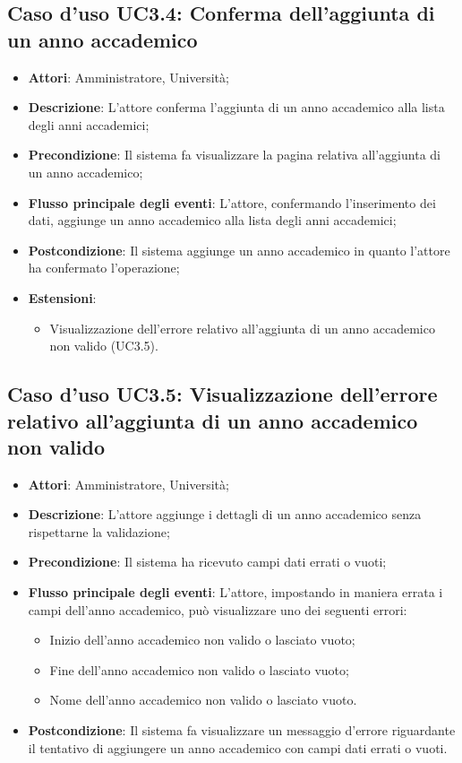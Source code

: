 \subsection{Caso d'uso \texorpdfstring{UC3.4}{UC3.4}: Conferma dell'aggiunta di un anno accademico}
\begin{itemize}
	\item \textbf{Attori}: Amministratore, Università;
	\item \textbf{Descrizione}: L'attore conferma l'aggiunta di un anno accademico alla lista degli anni accademici;
	\item \textbf{Precondizione}: Il sistema fa visualizzare la pagina relativa all'aggiunta di un anno accademico;
	\item \textbf{Flusso principale degli eventi}: L'attore, confermando l'inserimento dei dati, aggiunge un anno accademico alla lista degli anni accademici;
	\item \textbf{Postcondizione}: Il sistema aggiunge un anno accademico in quanto l'attore ha confermato l'operazione;
	\item \textbf{Estensioni}:
	\begin{itemize}
		\item Visualizzazione dell'errore relativo all'aggiunta di un anno accademico non valido (UC3.5).
	\end{itemize}
\end{itemize}
\subsection{Caso d'uso \texorpdfstring{UC3.5}{UC3.5}: Visualizzazione dell'errore relativo all'aggiunta di un anno accademico non valido}
\begin{itemize}
	\item \textbf{Attori}: Amministratore, Università;
	\item \textbf{Descrizione}: L'attore aggiunge i dettagli di un anno accademico senza rispettarne la validazione;
	\item \textbf{Precondizione}: Il sistema ha ricevuto campi dati errati o vuoti;
	\item \textbf{Flusso principale degli eventi}: L'attore, impostando in maniera errata i campi dell'anno accademico, può visualizzare uno dei seguenti errori:
	\begin{itemize}
		\item Inizio dell'anno accademico non valido o lasciato vuoto;
		\item Fine dell'anno accademico non valido o lasciato vuoto;
		\item Nome dell'anno accademico non valido o lasciato vuoto.
	\end{itemize}
	\item \textbf{Postcondizione}: Il sistema fa visualizzare un messaggio d'errore riguardante il tentativo di aggiungere un anno accademico con campi dati errati o vuoti.
\end{itemize}
